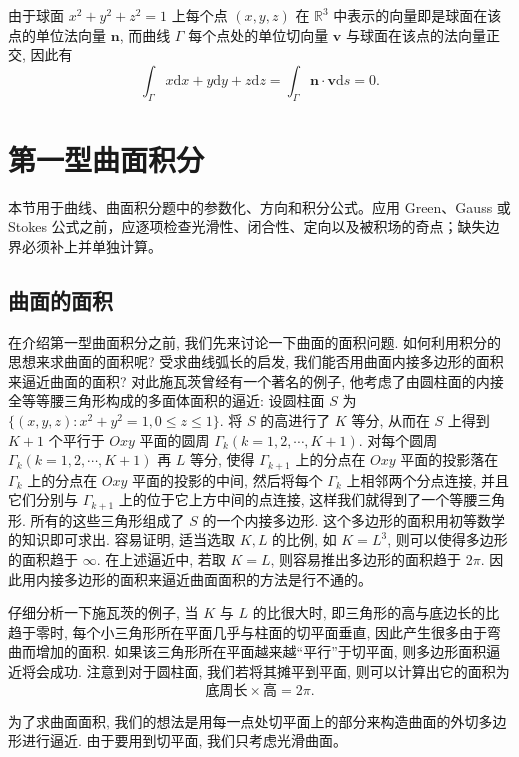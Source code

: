 \documentclass[12pt,fontset=fandol]{ctexart}
\begin{document}
\noindent{}\quad 由于球面 $x^2+y^2+z^2=1$ 上每个点 $(x,y,z)$ 在 $\mathbb R^3$ 中表示的向量即是球面在该点的单位法向量 $\boldsymbol n$, 而曲线 $\Gamma$ 每个点处的单位切向量 $\boldsymbol v$ 与球面在该点的法向量正交, 因此有
\[
  \int_\Gamma x\mathrm dx+y\mathrm dy+z\mathrm dz
  =\int_\Gamma \boldsymbol n\cdot\boldsymbol v\mathrm ds=0.
\]



\section{第一型曲面积分}\label{course-16-3}
本节用于曲线、曲面积分题中的参数化、方向和积分公式。应用 Green、Gauss 或 Stokes 公式之前，应逐项检查光滑性、闭合性、定向以及被积场的奇点；缺失边界必须补上并单独计算。

\subsection{曲面的面积}

在介绍第一型曲面积分之前, 我们先来讨论一下曲面的面积问题. 如何利用积分的思想来求曲面的面积呢? 受求曲线弧长的启发, 我们能否用曲面内接多边形的面积来逼近曲面的面积? 对此施瓦茨曾经有一个著名的例子, 他考虑了由圆柱面的内接全等等腰三角形构成的多面体面积的逼近: 设圆柱面 $S$ 为 $\{(x,y,z):x^2+y^2=1,0\leqslant z\leqslant1\}$. 将 $S$ 的高进行了 $K$ 等分, 从而在 $S$ 上得到 $K+1$ 个平行于 $Oxy$ 平面的圆周 $\Gamma_k(k=1,2,\cdots,K+1)$. 对每个圆周 $\Gamma_k(k=1,2,\cdots,K+1)$ 再 $L$ 等分, 使得 $\Gamma_{k+1}$ 上的分点在 $Oxy$ 平面的投影落在 $\Gamma_k$ 上的分点在 $Oxy$ 平面的投影的中间, 然后将每个 $\Gamma_k$ 上相邻两个分点连接, 并且它们分别与 $\Gamma_{k+1}$ 上的位于它上方中间的点连接, 这样我们就得到了一个等腰三角形. 所有的这些三角形组成了 $S$ 的一个内接多边形. 这个多边形的面积用初等数学的知识即可求出. 容易证明, 适当选取 $K,L$ 的比例, 如 $K=L^3$, 则可以使得多边形的面积趋于 $\infty$. 在上述逼近中, 若取 $K=L$, 则容易推出多边形的面积趋于 $2\pi$. 因此用内接多边形的面积来逼近曲面面积的方法是行不通的。

仔细分析一下施瓦茨的例子, 当 $K$ 与 $L$ 的比很大时, 即三角形的高与底边长的比趋于零时, 每个小三角形所在平面几乎与柱面的切平面垂直, 因此产生很多由于弯曲而增加的面积. 如果该三角形所在平面越来越“平行”于切平面, 则多边形面积逼近将会成功. 注意到对于圆柱面, 我们若将其摊平到平面, 则可以计算出它的面积为
\[
  \text{底周长}\times\text{高}=2\pi.
\]

为了求曲面面积, 我们的想法是用每一点处切平面上的部分来构造曲面的外切多边形进行逼近. 由于要用到切平面, 我们只考虑光滑曲面。
\end{document}
